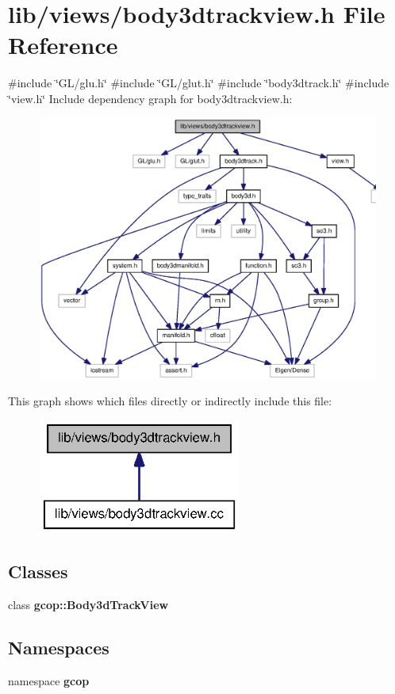 \section{lib/views/body3dtrackview.h \-File \-Reference}
\label{body3dtrackview_8h}
{\ttfamily \#include \char`\"{}\-G\-L/glu.\-h\char`\"{}}\*
{\ttfamily \#include \char`\"{}\-G\-L/glut.\-h\char`\"{}}\*
{\ttfamily \#include \char`\"{}body3dtrack.\-h\char`\"{}}\*
{\ttfamily \#include \char`\"{}view.\-h\char`\"{}}\*
\-Include dependency graph for body3dtrackview.\-h\-:
\nopagebreak
\begin{figure}[H]
\begin{center}
\leavevmode
\includegraphics[width=350pt]{body3dtrackview_8h__incl}
\end{center}
\end{figure}
\-This graph shows which files directly or indirectly include this file\-:
\nopagebreak
\begin{figure}[H]
\begin{center}
\leavevmode
\includegraphics[width=188pt]{body3dtrackview_8h__dep__incl}
\end{center}
\end{figure}
\subsection*{\-Classes}
\begin{DoxyCompactItemize}
\item 
class {\bf gcop\-::\-Body3d\-Track\-View}
\end{DoxyCompactItemize}
\subsection*{\-Namespaces}
\begin{DoxyCompactItemize}
\item 
namespace {\bf gcop}
\end{DoxyCompactItemize}
